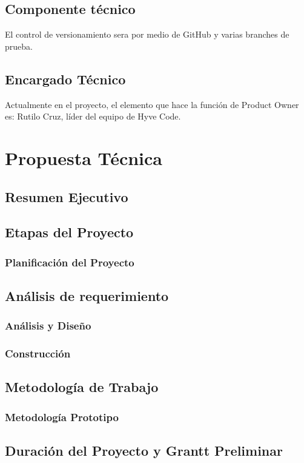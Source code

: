 \documentclass{report}
\begin{document}
		\section{Componente técnico}
			El control de versionamiento sera por medio de GitHub y varias branches de prueba.
		\section{Encargado Técnico}
			Actualmente en el proyecto, el elemento que hace la función de Product Owner es: Rutilo Cruz, líder del equipo de Hyve Code.
	
	\chapter{Propuesta Técnica}
		\section{Resumen Ejecutivo}
		\section{Etapas del Proyecto}
			\subsection{Planificación del Proyecto}
		\section{Análisis de requerimiento}
			\subsection{Análisis y Diseño}
			\subsection{Construcción}
		\section{Metodología de Trabajo}
			\subsection{Metodología Prototipo}
		\section{Duración del Proyecto y Grantt Preliminar}	
	
\end{document}
